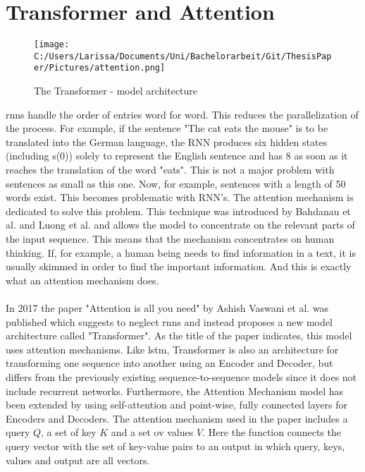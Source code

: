 \documentclass[a4paper, 11pt,titlepage,oneside,openany]{book}
\begin{document}
\section{Transformer and Attention}
\begin{figure}[ht]
	\centering
	\texttt{[image: C:/Users/Larissa/Documents/Uni/Bachelorarbeit/Git/ThesisPaper/Pictures/attention.png]}
	\caption{The Transformer - model architecture \cite{attention}}
\end{figure}
\noindent \gls{rnn}s handle the order of entries word for word. This reduces the parallelization of the process. For example, if the sentence "The cat eats the mouse" is to be translated into the German language, the RNN produces six hidden states (including s(0)) solely to represent the English sentence and has 8 as soon as it reaches the translation of the word "eats". This is not a major problem with sentences as small as this one. Now, for example, sentences with a length of 50 words exist. This becomes problematic with RNN's. The attention mechanism is dedicated to solve this problem. This technique was introduced by Bahdanau et al. \cite{bahdnau} and Luong et al. \cite{lunong} and allows the model to concentrate on the relevant parts of the input sequence. This means that the mechanism concentrates on human thinking. If, for example, a human being needs to find information in a text, it is usually skimmed in order to find the important information. And this is exactly what an attention mechanism does. \\
\\In 2017 the paper "Attention is all you need" by Ashish Vaswani et al.  \cite{attention} was published which suggests to neglect \gls{rnn}s and instead proposes a new model architecture called "Transformer". As the title of the paper indicates, this model uses attention mechanisms. Like \gls{lstm}, Transformer is also an architecture for transforming one sequence into another using an Encoder and Decoder, but differs from the previously existing sequence-to-sequence models since it does not include recurrent networks. Furthermore, the Attention Mechanism model has been extended by using self-attention and point-wise, fully connected layers for Encoders and Decoders.
The attention mechanism used in the paper includes a query $Q$, a set of key $K$ and a set ov values $V$. Here the function connects the query vector with the set of key-value pairs to an output in which query, keys, values and output are all vectors.\\
\end{document}
